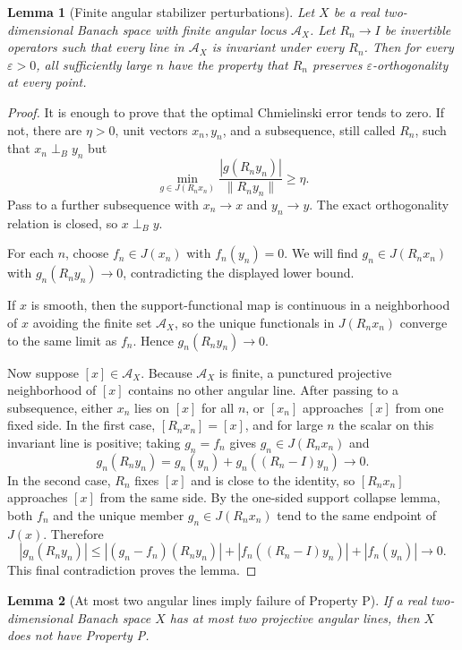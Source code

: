 \documentclass[11pt]{article}
\newtheorem{lemma}{Lemma}
\newcommand{\eps}{\varepsilon}
\newcommand{\cA}{\mathcal A}
\newcommand{\perpB}{\perp_B}
\begin{document}
\begin{lemma}[Finite angular stabilizer perturbations]
\label{lem:finite-stabilizer}
Let \(X\) be a real two-dimensional Banach space with finite angular locus
\(\cA_X\).  Let \(R_n\to I\) be invertible operators such that every line in
\(\cA_X\) is invariant under every \(R_n\).  Then for every \(\eps>0\), all
sufficiently large \(n\) have the property that \(R_n\) preserves
\(\eps\)-orthogonality at every point.
\end{lemma}

\begin{proof}
It is enough to prove that the optimal Chmielinski error tends to zero.  If
not, there are \(\eta>0\), unit vectors \(x_n,y_n\), and a subsequence, still
called \(R_n\), such that \(x_n\perpB y_n\) but
\[
  \min_{g\in J(R_nx_n)}\frac{|g(R_ny_n)|}{\|R_ny_n\|}\geq\eta.
\]
Pass to a further subsequence with \(x_n\to x\) and \(y_n\to y\).  The exact
orthogonality relation is closed, so \(x\perpB y\).

For each \(n\), choose \(f_n\in J(x_n)\) with \(f_n(y_n)=0\).  We will find
\(g_n\in J(R_nx_n)\) with \(g_n(R_ny_n)\to0\), contradicting the displayed
lower bound.

If \(x\) is smooth, then the support-functional map is continuous in a
neighborhood of \(x\) avoiding the finite set \(\cA_X\), so the unique
functionals in \(J(R_nx_n)\) converge to the same limit as \(f_n\).  Hence
\(g_n(R_ny_n)\to0\).

Now suppose \([x]\in\cA_X\).  Because \(\cA_X\) is finite, a punctured
projective neighborhood of \([x]\) contains no other angular line.  After
passing to a subsequence, either \(x_n\) lies on \([x]\) for all \(n\), or
\([x_n]\) approaches \([x]\) from one fixed side.  In the first case,
\([R_nx_n]=[x]\), and for large \(n\) the scalar on this invariant line is
positive; taking \(g_n=f_n\) gives \(g_n\in J(R_nx_n)\) and
\[
  g_n(R_ny_n)=g_n(y_n)+g_n((R_n-I)y_n)\to0.
\]
In the second case, \(R_n\) fixes \([x]\) and is close to the identity, so
\([R_nx_n]\) approaches \([x]\) from the same side.  By the one-sided support
collapse lemma, both \(f_n\) and the unique member \(g_n\in J(R_nx_n)\) tend to
the same endpoint of \(J(x)\).  Therefore
\[
  |g_n(R_ny_n)|\leq |(g_n-f_n)(R_ny_n)|+|f_n((R_n-I)y_n)|+|f_n(y_n)|\to0.
\]
This final contradiction proves the lemma.
\end{proof}

\begin{lemma}[At most two angular lines imply failure of Property P]
\label{lem:two-negative}
If a real two-dimensional Banach space \(X\) has at most two projective angular
lines, then \(X\) does not have Property P.
\end{lemma}
\end{document}
